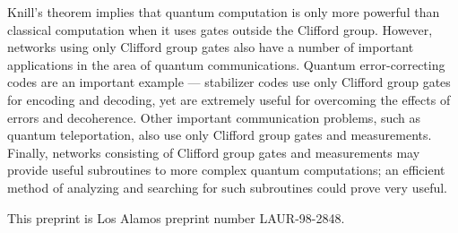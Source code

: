 Knill's theorem implies that quantum computation is only more powerful
than classical computation when it uses gates outside the Clifford
group.  However, networks using only Clifford group gates also have a
number of important applications in the area of quantum
communications.  Quantum error-correcting codes are an important
example --- stabilizer codes use only Clifford group gates for
encoding and decoding, yet are extremely useful for overcoming the
effects of errors and decoherence.  Other important communication
problems, such as quantum teleportation, also use only Clifford group
gates and measurements.  Finally, networks consisting of Clifford
group gates and measurements may provide useful subroutines to more
complex quantum computations; an efficient method of analyzing and
searching for such subroutines could prove very useful.

This preprint is Los Alamos preprint number LAUR-98-2848.
 
